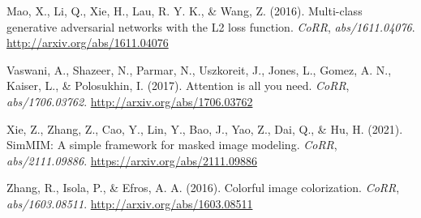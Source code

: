 \documentclass[
]{article}
\newlength{\cslhangindent}
\newlength{\cslentryspacingunit} %
\newenvironment{CSLReferences}[2] %
 {%
  \setlength{\parindent}{0pt}
  \ifodd #1
  \let\oldpar\par
  \def\par{\hangindent=\cslhangindent\oldpar}
  \fi
  \setlength{\parskip}{#2\cslentryspacingunit}
 }%
 {}
\begin{document}
\begin{CSLReferences}{1}{0}
\leavevmode{}%
Mao, X., Li, Q., Xie, H., Lau, R. Y. K., \& Wang, Z. (2016). Multi-class
generative adversarial networks with the {L2} loss function.
\emph{CoRR}, \emph{abs/1611.04076}.
\url{http://arxiv.org/abs/1611.04076}

\leavevmode{}%
Vaswani, A., Shazeer, N., Parmar, N., Uszkoreit, J., Jones, L., Gomez,
A. N., Kaiser, L., \& Polosukhin, I. (2017). Attention is all you need.
\emph{CoRR}, \emph{abs/1706.03762}.
\url{http://arxiv.org/abs/1706.03762}

\leavevmode{}%
Xie, Z., Zhang, Z., Cao, Y., Lin, Y., Bao, J., Yao, Z., Dai, Q., \& Hu,
H. (2021). SimMIM: {A} simple framework for masked image modeling.
\emph{CoRR}, \emph{abs/2111.09886}.
\url{https://arxiv.org/abs/2111.09886}

\leavevmode{}%
Zhang, R., Isola, P., \& Efros, A. A. (2016). Colorful image
colorization. \emph{CoRR}, \emph{abs/1603.08511}.
\url{http://arxiv.org/abs/1603.08511}

\end{CSLReferences}
\end{document}
